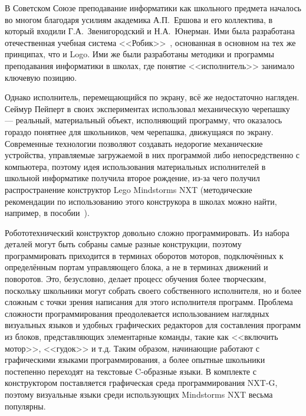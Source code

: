 \documentclass[a4paper]{article}
\begin{document}
В Советском Союзе преподавание информатики как школьного предмета началось во многом благодаря усилиям академика А.П.~Ершова и его коллектива, в который входили Г.А.~Звенигородский и Н.А.~Юнерман. Ими была разработана отечественная учебная система <<Робик>>~\cite{robik}, основанная в основном на тех же принципах, что и Logo. Ими же были разработаны методики и программы преподавания информатики в школах, где понятие <<исполнитель>> занимало ключевую позицию.

Однако исполнитель, перемещающийся по экрану, всё же недостаточно нагляден. Сеймур Пейперт в своих экспериментах использовал механическую черепашку~\cite{logoTurtle} --- реальный, материальный объект, исполняющий программу, что оказалось гораздо понятнее для школьников, чем черепашка, движущаяся по экрану. Современные технологии позволяют создавать недорогие механические устройства, управляемые загружаемой в них программой либо непосредственно с компьютера, поэтому идея использования материальных исполнителей в школьной информатике получила второе рождение, из-за чего получил распространение конструктор Lego Mindstorms NXT (методические рекомендации по использованию этого конструкора в школах можно найти, например, в пособии~\cite{filippov}). 

Робототехнический конструктор довольно сложно программировать. Из набора деталей могут быть собраны самые разные конструкции, поэтому программировать приходится в терминах оборотов моторов, подключённых к определённым портам управляющего блока, а не в терминах движений и поворотов. Это, безусловно, делает процесс обучения более творческим, поскольку школьники могут собрать своего собственного исполнителя, но и более сложным с точки зрения написания для этого исполнителя программ. Проблема сложности программирования преодолевается использованием наглядных визуальных языков и удобных графических редакторов для составления программ из блоков, представляющих элементарные команды, такие как <<включить мотор>>, <<гудок>> и т.д. Таким образом, начинающие работают с графическими языками программирования, а более опытные школьники постепенно переходят на текстовые C-образные языки. В комплекте с конструктором поставляется графическая среда программирования NXT-G, поэтому визуальные языки среди использующих Mindstorms NXT весьма популярны.
\end{document}
